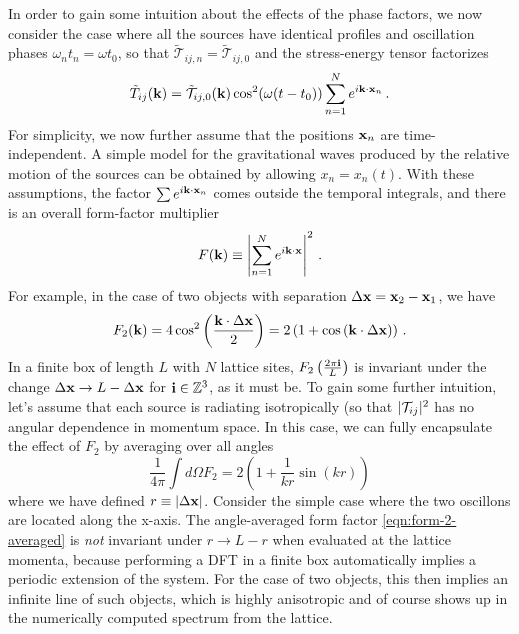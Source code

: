 \documentclass{revtex4}
\begin{document}
In order to gain some intuition about the effects of the phase factors,
we now consider the case where all the sources have identical profiles and oscillation phases $\omega_nt_n = \omega t_0$, so that $\tilde{\mathcal{T}}_{ij,n} = \tilde{\mathcal{T}}_{ij,0}$ and the stress-energy tensor factorizes
\begin{equation}
  \tilde{T}_{ij}({\bf k}) = \tilde{\mathcal{T}}_{ij,0}({\bf k})\cos^2(\omega (t-t_0)) \sum_{n=1}^N e^{i{\bf k}\cdot{\bf x}_n} \, .
\end{equation}
For simplicity, we now further assume that the positions ${\bf x}_n$ are time-independent.
A simple model for the gravitational waves produced by the relative motion of the sources can be obtained by allowing $x_n = x_n(t)$.
With these assumptions, the factor $\sum e^{i{\bf k}\cdot{\bf x}_n}$ comes outside the temporal integrals, and there is an overall form-factor multiplier
\begin{equation}
  F({\bf k}) \equiv \left|\sum_{n=1}^N e^{i{\bf k}\cdot{\bf x}}\right|^2 \, .
\end{equation}
For example, in the case of two objects with separation $\Delta{\bf x} = {\bf x}_2-{\bf x}_1$, we have
\begin{equation}
  F_2({\bf k}) = 4\cos^2\left(\frac{{\bf k}\cdot\Delta{\bf x}}{2}\right) = 2\left(1 + \cos\left({\bf k}\cdot\Delta{\bf x}\right)\right) \, .
\end{equation}
In a finite box of length $L$ with $N$ lattice sites, $F_2\left(\frac{2\pi {\bf i}}{L}\right)$ is invariant under the change $\Delta{\bf x} \to L - \Delta{\bf x}$ for ${\bf i}\in \mathbb{Z}^3$, as it must be.
To gain some further intuition, let's assume that each source is radiating isotropically (so that $|\mathcal{T}_{ij}|^2$ has no angular dependence in momentum space.
In this case, we can fully encapsulate the effect of $F_2$ by averaging over all angles
\begin{equation}
  \label{eqn:form-2-averaged}
  \frac{1}{4\pi}\int d\Omega F_2 = 2\left(1 + \frac{1}{kr}\sin\left(kr\right)\right)
\end{equation}
where we have defined $r \equiv |\Delta{\bf x}|$.
Consider the simple case where the two oscillons are located along the x-axis.
The angle-averaged form factor \eqref{eqn:form-2-averaged} is \emph{not} invariant under $r \to L - r$ when evaluated at the lattice momenta, because performing a DFT in a finite box automatically implies a periodic extension of the system.
For the case of two objects, this then implies an infinite line of such objects, which is highly anisotropic and of course shows up in the numerically computed spectrum from the lattice.
\end{document}
